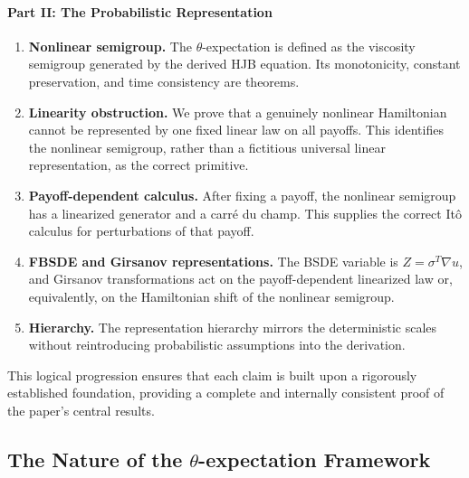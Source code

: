 \documentclass[12pt, letterpaper]{amsart}
\newcommand{\ThetaExpectation}{$\theta$-expectation}
\theoremstyle{plain}
\theoremstyle{definition}
\theoremstyle{remark}
\begin{document}
\paragraph{\bfseries Part II: The Probabilistic Representation}
\begin{enumerate}[wide, labelindent=0pt]
    \item[\textbf{Section \ref{sec:theta_expectation_corrected}:}] \textbf{Nonlinear semigroup.}  The \ThetaExpectation{} is defined as the viscosity semigroup generated by the derived HJB equation.  Its monotonicity, constant preservation, and time consistency are theorems.

    \item[\textbf{Section \ref{sec:no_nonlinear_mp}:}] \textbf{Linearity obstruction.}  We prove that a genuinely nonlinear Hamiltonian cannot be represented by one fixed linear law on all payoffs.  This identifies the nonlinear semigroup, rather than a fictitious universal linear representation, as the correct primitive.

    \item[\textbf{Section \ref{sec:linearization_calculus}:}] \textbf{Payoff-dependent calculus.}  After fixing a payoff, the nonlinear semigroup has a linearized generator and a carré du champ.  This supplies the correct It\^o calculus for perturbations of that payoff.

    \item[\textbf{Sections \ref{sec:theta_bsde_corrected} and \ref{sec:girsanov_corrected}:}] \textbf{FBSDE and Girsanov representations.}  The BSDE variable is $Z=\sigma^T\nabla u$, and Girsanov transformations act on the payoff-dependent linearized law or, equivalently, on the Hamiltonian shift of the nonlinear semigroup.

    \item[\textbf{Section \ref{sec:prob_hierarchy_corrected}:}] \textbf{Hierarchy.}  The representation hierarchy mirrors the deterministic scales without reintroducing probabilistic assumptions into the derivation.
\end{enumerate}
This logical progression ensures that each claim is built upon a rigorously established foundation, providing a complete and internally consistent proof of the paper's central results.

\subsection{The Nature of the \texorpdfstring{\ThetaExpectation{}}{theta-Expectation} Framework}\label{rem:constructive_axiomatics}
\end{document}
